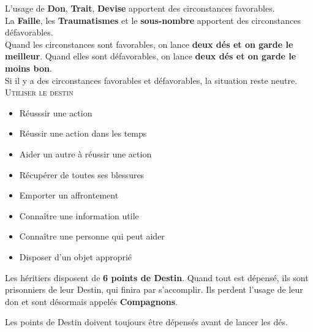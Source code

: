 \documentclass[12pt,twoside,a5paper]{article}
\begin{document}
L'usage de \textbf{Don}, \textbf{Trait}, \textbf{Devise} apportent des circonstances favorables.~\\
La \textbf{Faille}, les \textbf{Traumatismes} et le \textbf{sous-nombre} apportent des circonstances défavorables.~\\
Quand les circonstances sont favorables, on lance \textbf{deux dés et on garde le meilleur}. 
Quand elles sont défavorables, on lance \textbf{deux dés et on garde le moins bon}.~\\
Si il y a des circonstances favorables et défavorables, la situation reste neutre.~\\

\textsc{Utiliser le destin}~\\
	\begin{minipage}[h]{0.60\textwidth}
		\small
		\begin{itemize}
			\setlength{\parskip}{0pt}
			\setlength{\itemsep}{0pt plus 1pt}
			\item[$\bullet$] Réusssir une action
			\item[$\bullet$] Réussir une action dans les temps
			\item[$\bullet$] Aider un autre à réussir une action
			\item[$\bullet$] Récupérer de toutes ses blessures
			\item[$\bullet$] Emporter un affrontement
			\item[$\bullet$] Connaître une information utile
			\item[$\bullet$] Connaître une personne qui peut aider
			\item[$\bullet$] Disposer d'un objet approprié
		\end{itemize}
	\end{minipage} \hfill \begin{minipage}[h]{0.38\textwidth}
		\small
		Les héritiers disposent de \textbf{6 points de Destin}. Quand tout est dépensé, ils sont prisonniers de leur Destin, qui finira par s'accomplir. Ils perdent l'usage de leur don et sont désormais appelés \textbf{Compagnons}.
		
		Les points de Destin doivent toujours être dépensés avant de lancer les dés.
	\end{minipage}
\end{document}
